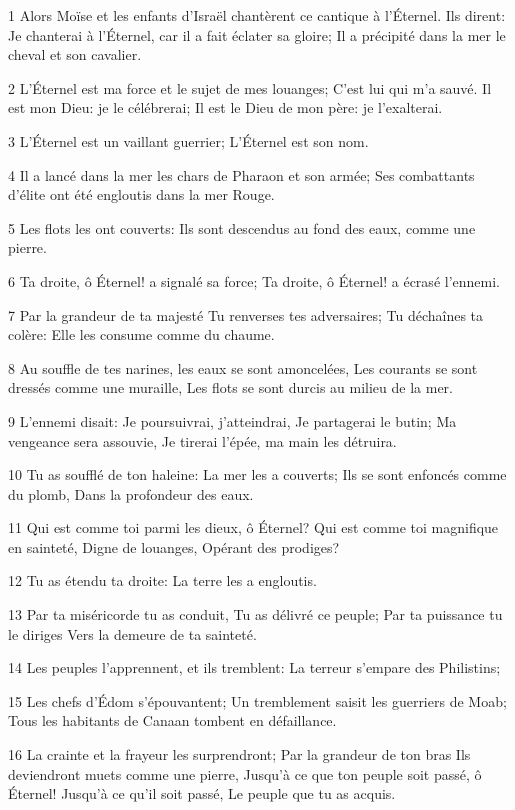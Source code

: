 \par 1 Alors Moïse et les enfants d'Israël chantèrent ce cantique à l'Éternel. Ils dirent: Je chanterai à l'Éternel, car il a fait éclater sa gloire; Il a précipité dans la mer le cheval et son cavalier.
\par 2 L'Éternel est ma force et le sujet de mes louanges; C'est lui qui m'a sauvé. Il est mon Dieu: je le célébrerai; Il est le Dieu de mon père: je l'exalterai.
\par 3 L'Éternel est un vaillant guerrier; L'Éternel est son nom.
\par 4 Il a lancé dans la mer les chars de Pharaon et son armée; Ses combattants d'élite ont été engloutis dans la mer Rouge.
\par 5 Les flots les ont couverts: Ils sont descendus au fond des eaux, comme une pierre.
\par 6 Ta droite, ô Éternel! a signalé sa force; Ta droite, ô Éternel! a écrasé l'ennemi.
\par 7 Par la grandeur de ta majesté Tu renverses tes adversaires; Tu déchaînes ta colère: Elle les consume comme du chaume.
\par 8 Au souffle de tes narines, les eaux se sont amoncelées, Les courants se sont dressés comme une muraille, Les flots se sont durcis au milieu de la mer.
\par 9 L'ennemi disait: Je poursuivrai, j'atteindrai, Je partagerai le butin; Ma vengeance sera assouvie, Je tirerai l'épée, ma main les détruira.
\par 10 Tu as soufflé de ton haleine: La mer les a couverts; Ils se sont enfoncés comme du plomb, Dans la profondeur des eaux.
\par 11 Qui est comme toi parmi les dieux, ô Éternel? Qui est comme toi magnifique en sainteté, Digne de louanges, Opérant des prodiges?
\par 12 Tu as étendu ta droite: La terre les a engloutis.
\par 13 Par ta miséricorde tu as conduit, Tu as délivré ce peuple; Par ta puissance tu le diriges Vers la demeure de ta sainteté.
\par 14 Les peuples l'apprennent, et ils tremblent: La terreur s'empare des Philistins;
\par 15 Les chefs d'Édom s'épouvantent; Un tremblement saisit les guerriers de Moab; Tous les habitants de Canaan tombent en défaillance.
\par 16 La crainte et la frayeur les surprendront; Par la grandeur de ton bras Ils deviendront muets comme une pierre, Jusqu'à ce que ton peuple soit passé, ô Éternel! Jusqu'à ce qu'il soit passé, Le peuple que tu as acquis.
